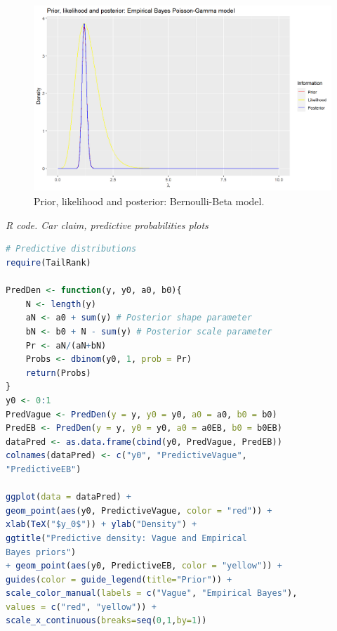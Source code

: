 \begin{enumerate}[leftmargin=*]
\begin{figure}[!h]
	\includegraphics[width=340pt, height=200pt]{Chapters/chapter1/figures/piorlikepost.png}
	\caption[List of figure caption goes here]{Prior, likelihood and posterior: Bernoulli-Beta model.}\label{fig12}
\end{figure}


\begin{tcolorbox}[enhanced,width=4.67in,center upper,
	fontupper=\large\bfseries,drop shadow southwest,sharp corners]
	\textit{R code. Car claim, predictive probabilities plots}
\begin{VF}
\begin{lstlisting}[basicstyle=\scriptsize, language=R]
# Predictive distributions
require(TailRank)

PredDen <- function(y, y0, a0, b0){
	N <- length(y)
	aN <- a0 + sum(y) # Posterior shape parameter
	bN <- b0 + N - sum(y) # Posterior scale parameter
	Pr <- aN/(aN+bN)
	Probs <- dbinom(y0, 1, prob = Pr)
	return(Probs)
}
y0 <- 0:1
PredVague <- PredDen(y = y, y0 = y0, a0 = a0, b0 = b0)
PredEB <- PredDen(y = y, y0 = y0, a0 = a0EB, b0 = b0EB)
dataPred <- as.data.frame(cbind(y0, PredVague, PredEB))
colnames(dataPred) <- c("y0", "PredictiveVague", 
"PredictiveEB")

ggplot(data = dataPred) + 
geom_point(aes(y0, PredictiveVague, color = "red")) +  
xlab(TeX("$y_0$")) + ylab("Density") +
ggtitle("Predictive density: Vague and Empirical 
Bayes priors") 
+ geom_point(aes(y0, PredictiveEB, color = "yellow")) +
guides(color = guide_legend(title="Prior")) +
scale_color_manual(labels = c("Vague", "Empirical Bayes"), 
values = c("red", "yellow")) +
scale_x_continuous(breaks=seq(0,1,by=1))

\end{lstlisting}
\end{VF}
\end{tcolorbox}


\end{enumerate}
